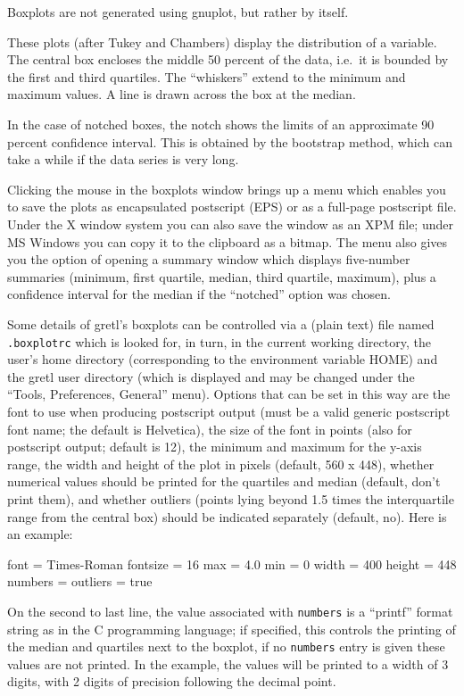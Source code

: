 Boxplots are not generated using gnuplot, but rather by 
itself.

These plots (after Tukey and Chambers) display the distribution
of a variable. The central box encloses the middle 50 percent of the
data, i.e.\ it is bounded by the first and third quartiles.  The
``whiskers'' extend to the minimum and maximum values.  A line is
drawn across the box at the median.

In the case of notched boxes, the notch shows the limits of an
approximate 90 percent confidence interval.  This is obtained by the
bootstrap method, which can take a while if the data series is very
long.

Clicking the mouse in the boxplots window brings up a menu which
enables you to save the plots as encapsulated postscript (EPS) or as a
full-page postscript file.  Under the X window system you can also
save the window as an XPM file; under MS Windows you can copy it to
the clipboard as a bitmap.  The menu also gives you the option of
opening a summary window which displays five-number summaries
(minimum, first quartile, median, third quartile, maximum), plus a
confidence interval for the median if the ``notched'' option was
chosen.  

Some details of gretl's boxplots can be controlled via a (plain text)
file named \verb+.boxplotrc+ which is looked for, in turn, in the
current working directory, the user's home directory (corresponding to
the environment variable HOME) and the gretl user directory (which is
displayed and may be changed under the ``Tools, Preferences, General''
menu).  Options that can be set in this way are the font to use when
producing postscript output (must be a valid generic postscript font
name; the default is Helvetica), the size of the font in points (also
for postscript output; default is 12), the minimum and maximum for the
y-axis range, the width and height of the plot in pixels (default, 560
x 448), whether numerical values should be printed for the quartiles
and median (default, don't print them), and whether outliers (points
lying beyond 1.5 times the interquartile range from the central box)
should be indicated separately (default, no).  Here is an example:

\begin{code}
    font = Times-Roman
    fontsize = 16
    max = 4.0
    min = 0
    width = 400
    height = 448
    numbers = %
    outliers = true
\end{code}

On the second to last line, the value associated with \verb+numbers+
is a ``printf'' format string as in the C programming language; if
specified, this controls the printing of the median and quartiles next
to the boxplot, if no \verb+numbers+ entry is given these values are
not printed.  In the example, the values will be printed to a width of
3 digits, with 2 digits of precision following the decimal point.

